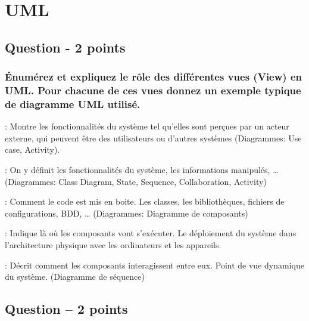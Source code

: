 \section{UML}



\subsection{Question - 2 points}



\subsubsection{Énumérez et expliquez le rôle des différentes vues (View) en UML. Pour chacune de ces vues donnez un exemple typique de diagramme UML utilisé.}
\begin{description}
\color[rgb]{0,0.48,0.58}
	\item [Use case]: Montre les fonctionnalités du système tel qu'elles sont perçues par un acteur externe, qui peuvent être des utilisateurs ou d'autres systèmes (Diagrammes: Use case, Activity).

	\item [Logical view]: On y définit les fonctionnalités du système, les informations manipulés, … (Diagrammes: Class Diagram, State, Sequence, Collaboration, Activity)

	\item [Component view]: Comment le code est mis en boite. Les classes, les bibliothèques, fichiers de configurations, BDD, … (Diagrammes: Diagramme de composants)

	\item [Deployment view]: Indique là où les composants vont s'exécuter.  Le déploiement du système dans l'architecture physique avec les ordinateurs et les appareils.

	\item [Concurrency view]: Décrit comment les composants interagissent entre eux. Point de vue dynamique du système. (Diagramme de séquence)
\end{description}



\subsection{Question – 2 points}



